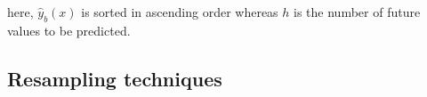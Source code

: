 \documentclass[preprint,11pt,authoryear]{elsarticle}
\begin{document}
here, $\hat{y}_{b}(x)$  is  sorted in ascending order whereas $h$ is the number of future values to be predicted.

\subsection{Resampling techniques} \label{Subsec:resampling}

\end{document}
